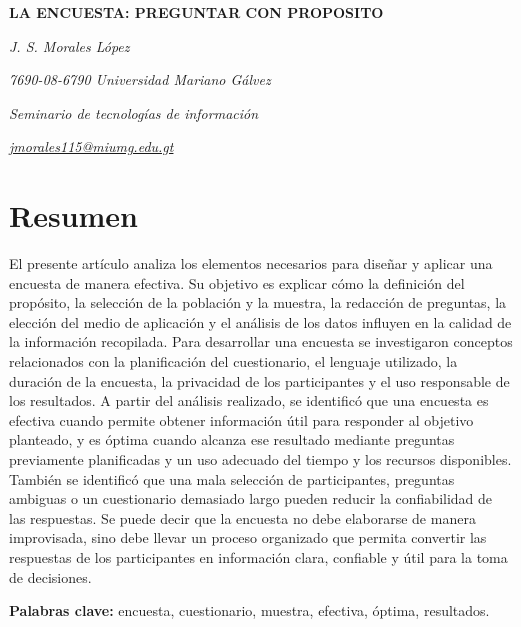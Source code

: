 \documentclass[12pt]{article}
\author{Jenny Sofía Morales}
\begin{document}
	
	\begin{center}
		
		{\bfseries\fontsize{12}{14}\selectfont
			LA ENCUESTA: PREGUNTAR CON PROPOSITO
		}
		
		\vspace{0.4cm}
		
		{\itshape J. S. Morales López}
		
		\vspace{0.2cm}
		
		{\itshape 7690-08-6790 Universidad Mariano Gálvez}
		
		{\itshape Seminario de tecnologías de información}
		
		{\itshape
			\href{mailto:jmorales115@miumg.edu.gt}
			{jmorales115@miumg.edu.gt}
		}
		
	\end{center}
	
	\vspace{0.5cm}
	\section*{Resumen}
	
	El presente artículo analiza los elementos necesarios para diseñar y
	aplicar una encuesta de manera efectiva. Su objetivo es explicar cómo la
	definición del propósito, la selección de la población y la muestra, la
	redacción de preguntas, la elección del medio de aplicación y el
	análisis de los datos influyen en la calidad de la información recopilada.
	Para desarrollar una encuesta se investigaron conceptos relacionados con la
	planificación del cuestionario, el lenguaje utilizado, la duración de la
	encuesta, la privacidad de los participantes y el uso responsable de los
	resultados. A partir del análisis realizado, se identificó que una encuesta
	es efectiva cuando permite obtener información útil para responder al
	objetivo planteado, y es óptima cuando alcanza ese resultado mediante
	preguntas previamente planificadas y un uso adecuado del tiempo y los recursos
	disponibles. También se identificó que una mala selección de participantes,
	preguntas ambiguas o un cuestionario demasiado largo pueden reducir
	la confiabilidad de las respuestas. Se puede decir que la encuesta no debe
	elaborarse de manera improvisada, sino debe llevar un proceso organizado que
	permita convertir las respuestas de los participantes en información
	clara, confiable y útil para la toma de decisiones.
	
	\noindent
	\textbf{Palabras clave:} encuesta, cuestionario, muestra, efectiva, óptima,	resultados.
	
\end{document}
